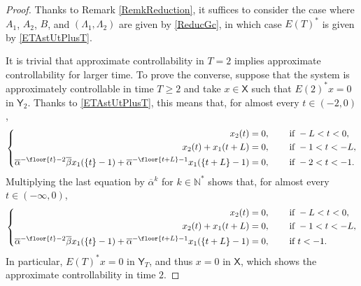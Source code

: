 \begin{proof}
Thanks to Remark \ref{RemkReduction}, it suffices to consider the case where $A_1$, $A_2$, $B$, and $(\Lambda_1, \Lambda_2)$ are given by \eqref{ReducGc}, in which case $E(T)^\ast$ is given by \eqref{ETAstUtPlusT}.

It is trivial that approximate controllability in $T = 2$ implies approximate controllability for larger time. To prove the converse, suppose that the system is approximately controllable in time $T \geq 2$ and take $x \in \mathsf X$ such that $E(2)^\ast x = 0$ in $\mathsf Y_2$. Thanks to \eqref{ETAstUtPlusT}, this means that, for almost every $t \in (-2, 0)$,
\[
\left\{
\begin{aligned}
x_2(t) & = 0, & \quad & \text{ if } -L < t < 0, \\
x_2(t) + x_1(t + L) & = 0, & & \text{ if } -1 < t < -L, \\
\overline\alpha^{-\floor{t} - 2} \overline\beta x_1(\{t\} - 1) + \overline\alpha^{-\floor{t + L} - 1} x_1(\{t + L\} - 1) & = 0, & & \text{ if } -2 < t < -1.
\end{aligned}
\right.
\]
Multiplying the last equation by $\overline\alpha^k$ for $k \in \mathbb N^\ast$ shows that, for almost every $t \in (-\infty, 0)$,
\[
\left\{
\begin{aligned}
x_2(t) & = 0, & \quad & \text{ if } -L < t < 0, \\
x_2(t) + x_1(t + L) & = 0, & & \text{ if } -1 < t < -L, \\
\overline\alpha^{-\floor{t} - 2} \overline\beta x_1(\{t\} - 1) + \overline\alpha^{-\floor{t + L} - 1} x_1(\{t + L\} - 1) & = 0, & & \text{ if } t < -1.
\end{aligned}
\right.
\]
In particular, $E(T)^\ast x = 0$ in $\mathsf Y_T$, and thus $x = 0$ in $\mathsf X$, which shows the approximate controllability in time $2$.


\end{proof}
